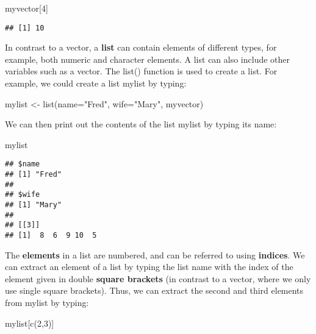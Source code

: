 \documentclass[
]{book}
\newenvironment{Shaded}{\begin{snugshade}}{\end{snugshade}}
\newcommand{\AttributeTok}[1]{\textcolor[rgb]{0.77,0.63,0.00}{#1}}
\newcommand{\DecValTok}[1]{\textcolor[rgb]{0.00,0.00,0.81}{#1}}
\newcommand{\FunctionTok}[1]{\textcolor[rgb]{0.00,0.00,0.00}{#1}}
\newcommand{\NormalTok}[1]{#1}
\newcommand{\OtherTok}[1]{\textcolor[rgb]{0.56,0.35,0.01}{#1}}
\newcommand{\StringTok}[1]{\textcolor[rgb]{0.31,0.60,0.02}{#1}}
\begin{document}
\begin{Shaded}
\begin{Highlighting}[]
\NormalTok{myvector[}\DecValTok{4}\NormalTok{]}
\end{Highlighting}
\end{Shaded}

\begin{verbatim}
## [1] 10
\end{verbatim}

In contrast to a vector, a \textbf{list} can contain elements of different types, for example, both numeric and character elements. A list can also include other variables such as a vector. The list() function is used to create a list. For example, we could create a list mylist by typing:

\begin{Shaded}
\begin{Highlighting}[]
\NormalTok{mylist }\OtherTok{\textless{}{-}} \FunctionTok{list}\NormalTok{(}\AttributeTok{name=}\StringTok{"Fred"}\NormalTok{, }\AttributeTok{wife=}\StringTok{"Mary"}\NormalTok{, myvector)}
\end{Highlighting}
\end{Shaded}

We can then print out the contents of the list mylist by typing its name:

\begin{Shaded}
\begin{Highlighting}[]
\NormalTok{mylist}
\end{Highlighting}
\end{Shaded}

\begin{verbatim}
## $name
## [1] "Fred"
## 
## $wife
## [1] "Mary"
## 
## [[3]]
## [1]  8  6  9 10  5
\end{verbatim}

The \textbf{elements} in a list are numbered, and can be referred to using \textbf{indices}. We can extract an element of a list by typing the list name with the index of the element given in double \textbf{square brackets} (in contrast to a vector, where we only use single square brackets). Thus, we can extract the second and third elements from mylist by typing:

\begin{Shaded}
\begin{Highlighting}[]
\NormalTok{mylist[}\FunctionTok{c}\NormalTok{(}\DecValTok{2}\NormalTok{,}\DecValTok{3}\NormalTok{)]}
\end{Highlighting}
\end{Shaded}
\end{document}
